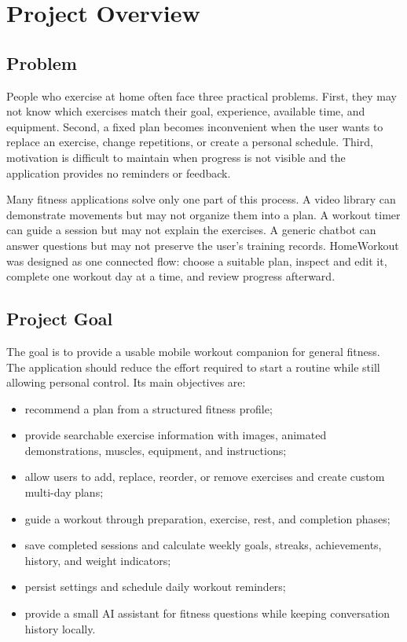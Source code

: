 \section{Project Overview}

\subsection{Problem}

People who exercise at home often face three practical problems. First, they may not know which exercises match their goal, experience, available time, and equipment. Second, a fixed plan becomes inconvenient when the user wants to replace an exercise, change repetitions, or create a personal schedule. Third, motivation is difficult to maintain when progress is not visible and the application provides no reminders or feedback.

Many fitness applications solve only one part of this process. A video library can demonstrate movements but may not organize them into a plan. A workout timer can guide a session but may not explain the exercises. A generic chatbot can answer questions but may not preserve the user's training records. HomeWorkout was designed as one connected flow: choose a suitable plan, inspect and edit it, complete one workout day at a time, and review progress afterward.

\subsection{Project Goal}

The goal is to provide a usable mobile workout companion for general fitness. The application should reduce the effort required to start a routine while still allowing personal control. Its main objectives are:

\begin{itemize}
    \item recommend a plan from a structured fitness profile;
    \item provide searchable exercise information with images, animated demonstrations, muscles, equipment, and instructions;
    \item allow users to add, replace, reorder, or remove exercises and create custom multi-day plans;
    \item guide a workout through preparation, exercise, rest, and completion phases;
    \item save completed sessions and calculate weekly goals, streaks, achievements, history, and weight indicators;
    \item persist settings and schedule daily workout reminders;
    \item provide a small AI assistant for fitness questions while keeping conversation history locally.
\end{itemize}

